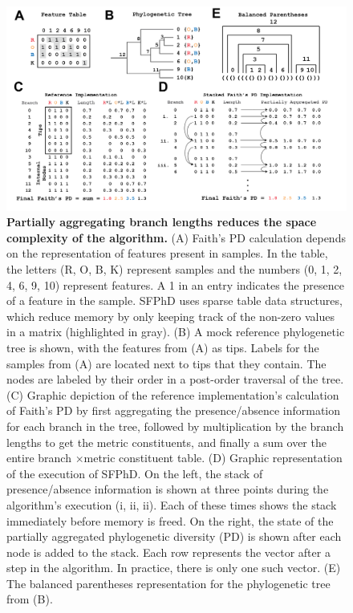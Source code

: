 \begin{figure}[htbp]
\centering
\includegraphics[width=\textwidth]{faiths-pd-figures/figure01.png}
\caption[Partially aggregating branch lengths reduces the space complexity of the algorithm.]{\textbf{Partially aggregating branch lengths reduces the space complexity of the algorithm.} (A) Faith's PD calculation depends on the representation of features present in samples. In the table, the letters (R, O, B, K) represent samples and the numbers (0, 1, 2, 4, 6, 9, 10) represent features. A 1 in an entry indicates the presence of a feature in the sample. SFPhD uses sparse table data structures, which reduce memory by only keeping track of the non-zero values in a matrix (highlighted in gray). (B) A mock reference phylogenetic tree is shown, with the features from (A) as tips. Labels for the samples from (A) are located next to tips that they contain. The nodes are labeled by their order in a post-order traversal of the tree. (C) Graphic depiction of the reference implementation's calculation of Faith's PD by first aggregating the presence/absence information for each branch in the tree, followed by multiplication by the branch lengths to get the metric constituents, and finally a sum over the entire branch ×metric constituent table. (D) Graphic representation of the execution of SFPhD. On the left, the stack of presence/absence information is shown at three points during the algorithm's execution (i, ii, ii). Each of these times shows the stack immediately before memory is freed. On the right, the state of the partially aggregated phylogenetic diversity (PD) is shown after each node is added to the stack. Each row represents the vector after a step in the algorithm. In practice, there is only one such vector. (E) The balanced parentheses representation for the phylogenetic tree from (B).}
\label{faiths_pd_fig1}
\end{figure}

